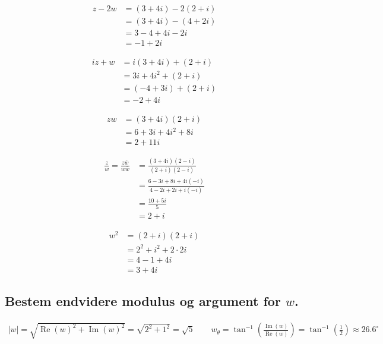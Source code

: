 \documentclass[11pt,a4paper]{article}
\newcommand{\modulus}[1]{\lvert#1\rvert}
\newcommand{\conjugate}[1]{\bar{#1}}
\newcommand{\degree}{^{\circ}}
\DeclareMathOperator{\re}{Re}
\DeclareMathOperator{\im}{Im}
\begin{document}
\begin{multicols}{2}
    
    \begin{align*}
        z - 2w &= (3 + 4i) - 2(2 + i) \\
               &= (3 + 4i) - (4 + 2i) \\
               &= 3 - 4 + 4i - 2i \\
               &= -1 + 2i
    \end{align*}

    \begin{align*}
        iz + w &= i(3 + 4i) + (2 + i) \\
               &= 3i + 4i^2 + (2 + i) \\
               &= (-4 + 3i) + (2 + i) \\
               &= -2 + 4i
    \end{align*}

    \begin{align*}
        zw &= (3 + 4i)(2 + i) \\
           &= 6 + 3i + 4i^2 + 8i \\
           &= 2 + 11i
    \end{align*}

    \vfill\columnbreak

    \begin{align*}
        \frac{z}{w} = \frac{z\conjugate{w}}{w\conjugate{w}}
                   &= \frac{(3 + 4i)(2 - i)}{(2 + i)(2 - i)} \\
                   &= \frac{6 - 3i + 8i + 4i(-i)}{4 - 2i + 2i + i(-i)} \\
                   &= \frac{10 + 5i}{5} \\
                   &= 2 + i
    \end{align*}

    \begin{align*}
        w^2 &= (2 + i)(2 + i) \\
            &= 2^2 + i^2 + 2 \cdot 2 i \\
            &= 4 - 1 + 4i \\
            &= 3 + 4i
    \end{align*}

\end{multicols}

\subsection{\mdseries
    Bestem endvidere modulus og argument for $w$.
}
\begin{align*}
    \modulus{w} = \sqrt{\re(w)^2 + \im(w)^2}
                = \sqrt{2^2 + 1^2}
                = \sqrt{5}
    \qquad
    w_\theta = \tan^{-1}\left(\frac{\im(w)}{\re(w)}\right)
             = \tan^{-1}\left(\frac{1}{2}\right)
             \approx 26.6\degree
\end{align*}
\end{document}
